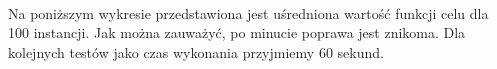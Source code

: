 \documentclass{article}
\begin{document}

\begin{center}
\end{center}


\large{}\normalsize\\
Na poniższym wykresie przedstawiona jest uśredniona wartość funkcji celu
dla 100 instancji. Jak można zauważyć, po minucie poprawa jest znikoma.
Dla kolejnych testów jako czas wykonania przyjmiemy 60 sekund.


\begin{center}
\end{center}
\end{document}
